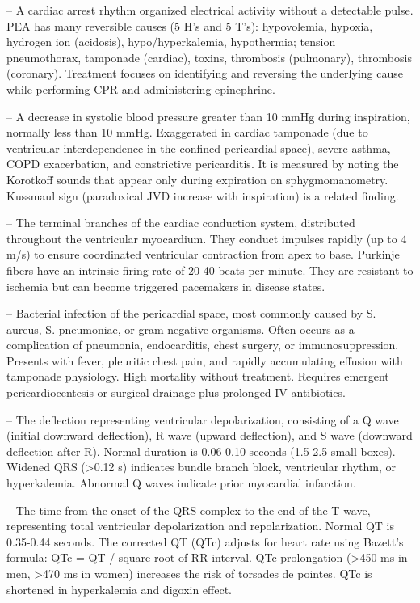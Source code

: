 -- A cardiac arrest rhythm organized electrical activity without a detectable pulse. PEA has many reversible causes (5 H's and 5 T's): hypovolemia, hypoxia, hydrogen ion (acidosis), hypo/hyperkalemia, hypothermia; tension pneumothorax, tamponade (cardiac), toxins, thrombosis (pulmonary), thrombosis (coronary). Treatment focuses on identifying and reversing the underlying cause while performing CPR and administering epinephrine.

-- A decrease in systolic blood pressure greater than 10 mmHg during inspiration, normally less than 10 mmHg. Exaggerated in cardiac tamponade (due to ventricular interdependence in the confined pericardial space), severe asthma, COPD exacerbation, and constrictive pericarditis. It is measured by noting the Korotkoff sounds that appear only during expiration on sphygmomanometry. Kussmaul sign (paradoxical JVD increase with inspiration) is a related finding.

-- The terminal branches of the cardiac conduction system, distributed throughout the ventricular myocardium. They conduct impulses rapidly (up to 4 m/s) to ensure coordinated ventricular contraction from apex to base. Purkinje fibers have an intrinsic firing rate of 20-40 beats per minute. They are resistant to ischemia but can become triggered pacemakers in disease states.

-- Bacterial infection of the pericardial space, most commonly caused by S. aureus, S. pneumoniae, or gram-negative organisms. Often occurs as a complication of pneumonia, endocarditis, chest surgery, or immunosuppression. Presents with fever, pleuritic chest pain, and rapidly accumulating effusion with tamponade physiology. High mortality without treatment. Requires emergent pericardiocentesis or surgical drainage plus prolonged IV antibiotics.

-- The deflection representing ventricular depolarization, consisting of a Q wave (initial downward deflection), R wave (upward deflection), and S wave (downward deflection after R). Normal duration is 0.06-0.10 seconds (1.5-2.5 small boxes). Widened QRS (>0.12 s) indicates bundle branch block, ventricular rhythm, or hyperkalemia. Abnormal Q waves indicate prior myocardial infarction.

-- The time from the onset of the QRS complex to the end of the T wave, representing total ventricular depolarization and repolarization. Normal QT is 0.35-0.44 seconds. The corrected QT (QTc) adjusts for heart rate using Bazett's formula: QTc = QT / square root of RR interval. QTc prolongation (>450 ms in men, >470 ms in women) increases the risk of torsades de pointes. QTc is shortened in hyperkalemia and digoxin effect.

